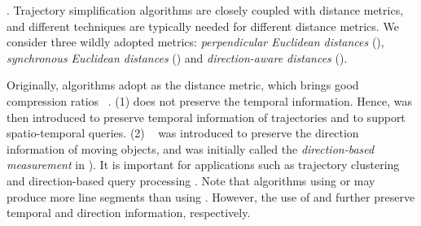 . Trajectory simplification algorithms are closely coupled with distance metrics, and different techniques are typically needed for different distance metrics.  We consider three wildly adopted metrics: \emph{perpendicular Euclidean distances} (\ped), \emph{synchronous Euclidean distances} (\sed) and \emph{direction-aware distances} (\dad).


Originally, \lsa algorithms adopt \ped as the distance metric, which brings good compression ratios~ \cite{Douglas:Peucker, Hershberger:Speeding, Liu:BQS, Muckell:Compression, Chen:Trajectory, Cao:Spatio, Shi:Survey}. (1) \ped does not preserve the temporal information. Hence, \sed was then introduced to preserve temporal information of trajectories and to support spatio-temporal queries\cite{Meratnia:Spatiotemporal}.
(2) \dad~\cite{Long:Direction, Zhang:Evaluation} was  introduced to preserve the direction information of moving objects, and was initially called the \emph{direction-based measurement} in \cite{Long:Direction}). It is important for applications such as trajectory clustering and direction-based query processing \cite{Long:Direction}.
%
Note that \lsa algorithms using \sed or \dad may produce more line segments than using \ped. However, the use of \sed and \dad further preserve temporal and direction information, respectively.





